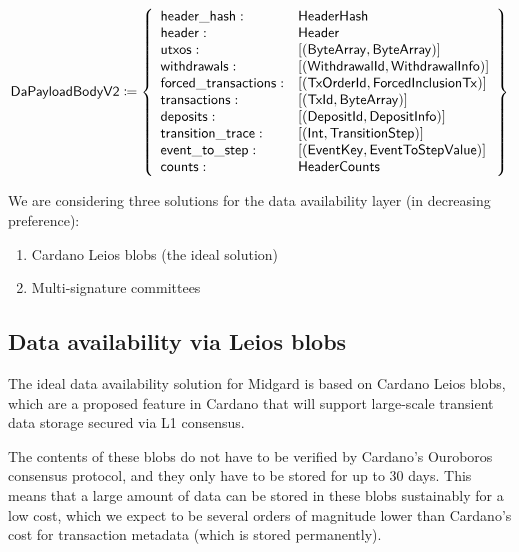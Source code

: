 \documentclass[../midgard.tex]{subfiles}
\begin{document}
\begin{equation*}
    \mathsf{DaPayloadBodyV2} \coloneq \left\{
    \begin{array}{ll}
        \mathsf{header\_hash} : & \mathsf{HeaderHash} \\
        \mathsf{header} : & \mathsf{Header} \\
        \mathsf{utxos} : & \mathsf{[(ByteArray, ByteArray)]} \\
        \mathsf{withdrawals} : & \mathsf{[(WithdrawalId, WithdrawalInfo)]} \\
        \mathsf{forced\_transactions} : & \mathsf{[(TxOrderId, ForcedInclusionTx)]} \\
        \mathsf{transactions} : & \mathsf{[(TxId, ByteArray)]} \\
        \mathsf{deposits} : & \mathsf{[(DepositId, DepositInfo)]} \\
        \mathsf{transition\_trace} : & \mathsf{[(Int, TransitionStep)]} \\
        \mathsf{event\_to\_step} : & \mathsf{[(EventKey, EventToStepValue)]} \\
        \mathsf{counts} : & \mathsf{HeaderCounts}
    \end{array} \right\}
\end{equation*}

We are considering three solutions for the data availability layer (in decreasing preference):
\begin{enumerate}
  \item Cardano Leios blobs (the ideal solution)
  \item Multi-signature committees
\end{enumerate}

\subsection{Data availability via Leios blobs}
\label{h:data-availability-leios}

The ideal data availability solution for Midgard is based on Cardano Leios blobs, which are a proposed feature in Cardano that will support large-scale transient data storage secured via L1 consensus.

The contents of these blobs do not have to be verified by Cardano's Ouroboros consensus protocol, and they only have to be stored for up to 30 days.
This means that a large amount of data can be stored in these blobs sustainably for a low cost, which we expect to be several orders of magnitude lower than Cardano's cost for transaction metadata (which is stored permanently).
\end{document}
